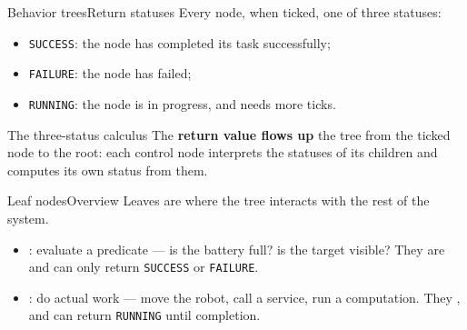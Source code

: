 \begin{frame}{Behavior trees}{Return statuses}
  \justifying
  Every node, when ticked,  one of three statuses:
  \begin{itemize}
    \item \texttt{SUCCESS}: the node has completed its task successfully;
    \item \texttt{FAILURE}: the node has failed;
    \item \texttt{RUNNING}: the node is in progress, and needs more ticks.
  \end{itemize}
  \bigskip
  \begin{block}{The three-status calculus}
    \justifying
    The \textbf{return value flows up} the tree from the ticked node to the root: each control node interprets the statuses of its children and computes its own status from them.
  \end{block}
\end{frame}

\begin{frame}{Leaf nodes}{Overview}
  \justifying
  Leaves are where the tree interacts with the rest of the system.
  \begin{itemize}
    \item {}: evaluate a predicate --- is the battery full? is the target visible? They are  and can only return \texttt{SUCCESS} or \texttt{FAILURE}.
    \item {}: do actual work --- move the robot, call a service, run a computation. They , and can return \texttt{RUNNING} until completion.
  \end{itemize}
\end{frame}

